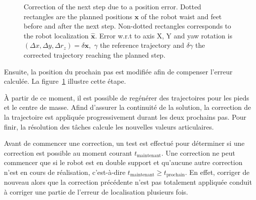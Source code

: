 \begin{figure}[ht!]
\begin{center}
  \end{center}
  \caption{Correction of the next step due to a position error. Dotted
    rectangles are the planned positions $\mathbf{x}$ of the robot
    waist and feet before and after the next step. Non-dotted
    rectangles corresponds to the robot localization
    $\mathbf{\hat{x}}$. Error w.r.t to axis X, Y and yaw rotation is
    \mbox{$(\Delta x, \Delta y, \Delta r_z) = \delta \mathbf{x}$,
      $\gamma$} the reference trajectory and $\delta \gamma$ the
    corrected trajectory reaching the planned
    step. \label{fig:footstepreplan}}
\end{figure}


Ensuite, la position du prochain pas est modifiée afin de compenser
l'erreur calculée. La figure \ref{fig:footstepreplan} illustre cette étape.


À partir de ce moment, il est possible de regénérer des trajectoires
pour les pieds et le centre de masse. Afind d'assurer la continuité de
la solution, la correction de la trajectoire est appliquée
progressivement durant les deux prochains pas. Pour finir, la
résolution des tâches calcule les nouvelles valeurs articulaires.


Avant de commencer une correction, un test est effectué pour
déterminer si une correction est possible au moment courant
$t_{\text{maintenant}}$. Une correction ne peut commencer que si le
robot est en double support et qu'aucune autre correction n'est en
cours de réalisation, c'est-à-dire \mbox{$t_{\text{maintenant}} \geq
  t_{\text{prochain}}$}. En effet, corriger de nouveau alors que la
correction précédente n'est pas totalement appliquée conduit à
corriger une partie de l'erreur de localisation plusieurs fois.



